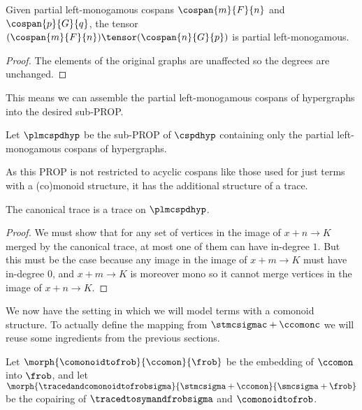 \begin{lemma}
    Given partial left-monogamous cospans \(\cospan{m}{F}{n}\)
    and \(\cospan{p}{G}{q}\), the tensor \(
    (\cospan{m}{F}{n})
    \tensor
    (\cospan{n}{G}{p})
    \) is partial left-monogamous.
\end{lemma}
\begin{proof}
    The elements of the original graphs are unaffected so
    the degrees are unchanged.
\end{proof}

This means we can assemble the partial left-monogamous cospans of hypergraphs
into the desired sub-PROP.

\begin{definition}
    Let \(\plmcspdhyp\) be the sub-PROP of \(\cspdhyp\) containing only the
    partial left-monogamous cospans of hypergraphs.
\end{definition}

As this PROP is not restricted to acyclic cospans like those used for just
terms with a (co)monoid structure, it has the additional structure of a trace.

\begin{proposition}
    The canonical trace is a trace on \(\plmcspdhyp\).
\end{proposition}
\begin{proof}
    We must show that for any set of vertices in the image
    of \(x + n \to K\) merged by the canonical trace, at most one of them can
    have in-degree \(1\).
    But this must be the case because any image in the image of
    \(x + m \to K\) must have in-degree \(0\), and \(x + m \to K\) is
    moreover mono so it cannot merge vertices in the image of
    \(x + n \to K\).
\end{proof}

We now have the setting in which we will model terms with a comonoid structure.
To actually define the mapping from \(\stmcsigmac + \ccomonc\) we will reuse
some ingredients from the previous sections.

\begin{definition}
    Let \(
    \morph{
        \comonoidtofrob
    }{
        \ccomon
    }{
        \frob
    }
    \) be the embedding of \(\ccomon\) into \(\frob\), and let \(
    \morph{
        \tracedandcomonoidtofrobsigma
    }{
        \stmcsigma + \ccomon
    }{
        \smcsigma + \frob
    }
    \) be the copairing of \(\tracedtosymandfrobsigma\) and
    \(\comonoidtofrob\).
\end{definition}

